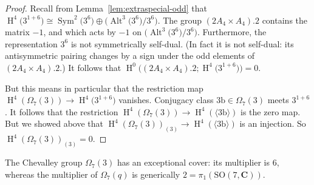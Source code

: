 \documentclass[pdftex]{sigma}
\numberwithin{equation}{section}
\newcommand\bC{\mathbf C}
\newcommand\rb{\mathrm b}
\DeclareMathOperator\homology{H}
\renewcommand\H{\homology}
\newcommand\<\langle
\renewcommand\>\rangle
\newcommand\SO{\mathrm{SO}}
\DeclareMathOperator\Sym{Sym}
\DeclareMathOperator\Alt{Alt}
\begin{document}
\begin{proof}
 Recall from Lemma~\ref{lem:extraspecial-odd} that $\H^4\big(3^{1+6}\big) \cong \Sym^2\big(3^6\big) \oplus \big(\Alt^3\big(3^6\big)/3^6\big)$. The group $(2A_4 \times A_4).2$ contains the matrix $-1$, and which acts by $-1$ on $\big(\Alt^3\big(3^6\big)/3^6\big)$. Furthermore, the representation $3^6$ is not symmetrically self-dual. (In fact it is not self-dual: its antisymmetric pairing changes by a sign under the odd elements of $(2A_4 \times A_4).2$.) It follows that $\H^0\big((2A_4 \times A_4).2; \H^4\big(3^{1+6}\big)\big) = 0$.

 But this means in particular that the restriction map $\H^4(\Omega_7(3)) \to \H^4\big(3^{1+6}\big)$ vanishes. Conjugacy class $3\rb \in \Omega_7(3)$ meets $3^{1+6}$. It follows that the restriction $\H^4(\Omega_7(3)) \to \H^4(\langle 3\rb\rangle)$ is the zero map. But we showed above that $\H^4(\Omega_7(3))_{(3)} \to \H^4(\langle 3\rb\rangle)$ is an injection. So $\H^4(\Omega_7(3))_{(3)} = 0$.
\end{proof}

The Chevalley group $\Omega_7(3)$ has an exceptional cover: its multiplier is $6$, whereas the multiplier of $\Omega_7(q)$ is generically $2 = \pi_1(\SO(7,\bC))$.
\end{document}
